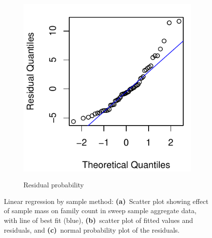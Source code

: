 \documentclass[10pt,letterpaper,twocolumn]{article}
\begin{document}
\begin{figure}[h]
\begin{subfigure}[b]{0.15\textwidth}
		\label{fig:bulk_sweep_resid}
	\end{subfigure}
	~
	\begin{subfigure}[b]{0.15\textwidth}
		\caption{Residual probability}
		\includegraphics[width=\textwidth]{plots//bulk/2015_bulk_sweep_qqplot.pdf}
		\label{fig:bulk_sweep_qqplot}
	\end{subfigure}
	\caption{Linear regression by sample method: \textbf{(a)}~Scatter plot showing effect of sample mass on family count in sweep sample aggregate data, with line of best fit (blue), \textbf{(b)}~scatter plot of fitted values and residuals, and \textbf{(c)}~normal probability plot of the residuals.}
	\label{fig:bulk_sweep_mass_vs_family}
	\smallskip
	\nointerlineskip
	\hrulefill
\end{figure}
\end{document}
